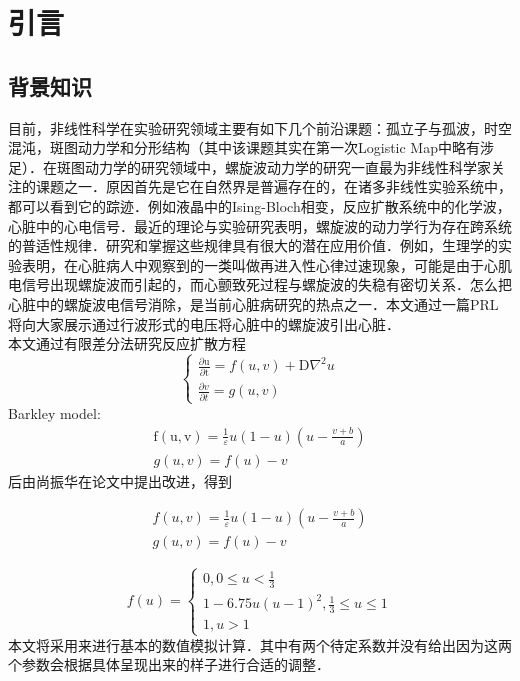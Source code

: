 \section{引言}
\subsection{背景知识}
目前，非线性科学在实验研究领域主要有如下几个前沿课题：孤立子与孤波，时空混沌，斑图动力学和分形结构（其中该课题其实在第一次Logistic Map中略有涉足）．在斑图动力学的研究领域中，螺旋波动力学的研究一直最为非线性科学家关注的课题之一．原因首先是它在自然界是普遍存在的，在诸多非线性实验系统中，都可以看到它的踪迹．例如液晶中的Ising-Bloch相变，反应扩散系统中的化学波，心脏中的心电信号．最近的理论与实验研究表明，螺旋波的动力学行为存在跨系统的普适性规律．研究和掌握这些规律具有很大的潜在应用价值．例如，生理学的实验表明，在心脏病人中观察到的一类叫做再进入性心律过速现象，可能是由于心肌电信号出现螺旋波而引起的，而心颤致死过程与螺旋波的失稳有密切关系．怎么把心脏中的螺旋波电信号消除，是当前心脏病研究的热点之一．本文通过一篇PRL\cite{zhang2005suppress}将向大家展示通过行波形式的电压将心脏中的螺旋波引出心脏．\\
本文通过有限差分法研究反应扩散方程
\begin{equation}
\left\{\begin{array}{c}
\frac{\partial \mathrm{u}}{\partial \mathrm{t}}=f(u, v)+\mathrm{D} \nabla^{2} u \\
\frac{\partial v}{\partial t}=g(u, v)
\end{array}\right.
\end{equation}
Barkley model:
\begin{equation}
\begin{array}{c}
\mathrm{f}(\mathrm{u}, \mathrm{v})=\frac{1}{\varepsilon} u(1-u)\left(u-\frac{v+b}{a}\right) \\
g(u, v)=f(u)-v
\end{array}
\end{equation}
后由尚振华在论文中提出改进，得到

\begin{equation}

\begin{array}{c}
	f(u, v)=\frac{1}{\varepsilon} u(1-u)\left(u-\frac{v+b}{a}\right)\\
	g(u, v)=f(u)-v
\end{array}
\end{equation}

\begin{equation}

f(u)=\left\{\begin{array}{c}
0,0 \leq u<\frac{1}{3} \\
1-6.75 u(u-1)^{2}, \frac{1}{3} \leq u \leq 1 \\
1, u>1
\end{array}\right.
\end{equation}
本文将采用来进行基本的数值模拟计算．其中有两个待定系数并没有给出因为这两个参数会根据具体呈现出来的样子进行合适的调整．
